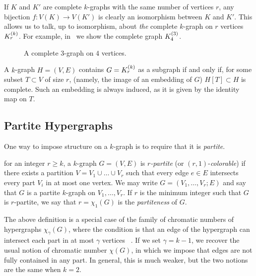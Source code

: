 If $K$ and $K'$ are complete $k$-graphs with the same number of vertices $r$,
any bijection $f: V(K) \to V(K')$ is clearly an isomorphism between $K$ and $K'$.
This allows us to talk, up to isomorphism, about \emph{the} complete $k$-graph on $r$ vertices $K^{(k)}_{r}$.
For example, in~ we show the complete graph $K^{(3)}_{4}$.

\begin{figure}[htbp]
    \centering
    
    \caption{A complete $3$-graph on $4$ vertices.}
    \label{fig:complete_kgraph}
\end{figure}

\begin{remark}
    A $k$-graph $H = (V, E)$ contains $G = K^{(k)}_{r}$ as a subgraph if and only if,
    for some subset $T \subset V$ of size $r$, (namely, the image of an embedding of $G$)
    $H[T] \subset H$ is complete.
    Such an embedding is always induced, as it is given by the identity map on $T$.
\end{remark}

\subsection{Partite Hypergraphs}\label{subsec:partite}

One way to impose structure on a $k$-graph is to require that it is \emph{partite}.

\begin{definition} \label{def:partite}
    for an integer $r \geq k$, a $k$-graph $G = (V, E)$ is \emph{$r$-partite}
    (or $(r, 1)$-\emph{colorable})
    if there exists a partition $V = V_1 \cup \dots \cup V_r$
    such that every edge $e \in E$ intersects every part $V_i$ in at most one vertex.
    We may write $G = (V_1, \dots, V_r; E)$ and say that
    $G$ is a partite $k$-graph on $V_1, \dots, V_r$.
    If $r$ is the minimum integer such that $G$ is $r$-partite,
    we say that $r = \chi_{1}(G)$ is the \emph{partiteness} of $G$.
\end{definition}

The above definition is a special case of the family of chromatic numbers of hypergraphs $\chi_{\gamma}(G)$,
where the condition is that an edge of the hypergraph can intersect each part in at most
$\gamma$ vertices ~\cite{krivelevich1998chromatic}.
If we set $\gamma = k - 1$, we recover the usual notion of chromatic number $\chi(G)$,
in which we impose that edges are not fully contained in any part.
In general, this is much weaker, but the two notions are the same when $k = 2$.

